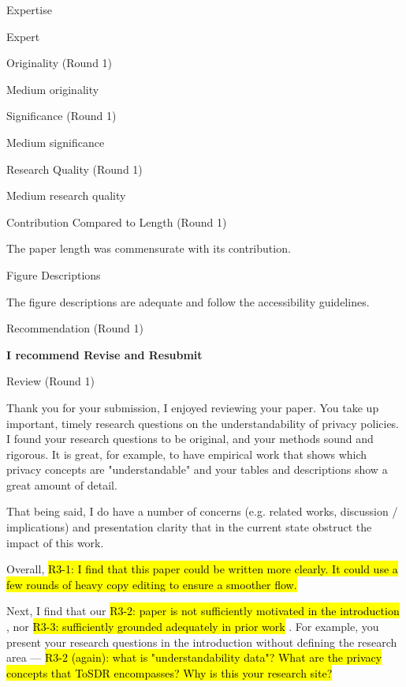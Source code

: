 Expertise

Expert

Originality (Round 1)

Medium originality

Significance (Round 1)

Medium significance

Research Quality (Round 1)

Medium research quality

Contribution Compared to Length (Round 1)

The paper length was commensurate with its contribution.

Figure Descriptions

The figure descriptions are adequate and follow the accessibility guidelines.

Recommendation (Round 1)

\textbf{I recommend Revise and Resubmit}

Review (Round 1)

Thank you for your submission, I enjoyed reviewing your paper. You take up
important, timely research questions on the understandability of
privacy policies. I found your research questions to be original, and
your methods sound and rigorous. It is great, for example, to have
empirical work that shows which privacy concepts are "understandable"
and your tables and descriptions show a great amount of detail.

That being said, I do have a number of concerns (e.g. related works, discussion /
implications) and presentation clarity that in the current state
obstruct the impact of this work.

Overall, 
\hl{R3-1: I find that this paper could be written more clearly. It could use a few
rounds of heavy copy editing to ensure a smoother flow.}

Next, I find that our 
\hl{R3-2: paper is not sufficiently motivated in the introduction}
, nor
\hl{R3-3: sufficiently grounded adequately in prior work}
. For example, you
present your research questions in the introduction without defining
the research area — 
\hl{R3-2 (again): what is "understandability data"? What are the
privacy concepts that ToSDR encompasses? Why is this your research
site?}

